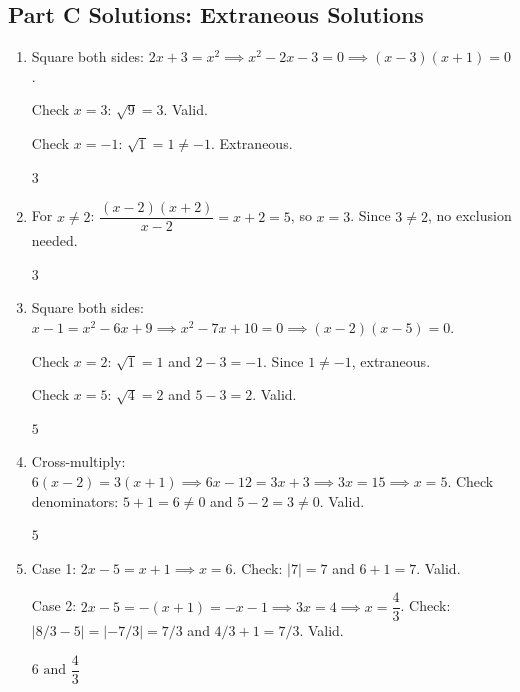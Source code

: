\documentclass[14pt]{extarticle}
\begin{document}
\subsection*{Part C Solutions: Extraneous Solutions}
\begin{enumerate}
  \item Square both sides: \(2x + 3 = x^2 \implies x^2 - 2x - 3 = 0 \implies (x-3)(x+1) = 0\).

  Check \(x = 3\): \(\sqrt{9} = 3\). Valid.

  Check \(x = -1\): \(\sqrt{1} = 1 \neq -1\). Extraneous.

  \(\boxed{3}\)

  \item For \(x \neq 2\): \(\dfrac{(x-2)(x+2)}{x-2} = x + 2 = 5\), so \(x = 3\). Since \(3 \neq 2\), no exclusion needed.

  \(\boxed{3}\)

  \item Square both sides: \(x - 1 = x^2 - 6x + 9 \implies x^2 - 7x + 10 = 0 \implies (x-2)(x-5) = 0\).

  Check \(x = 2\): \(\sqrt{1} = 1\) and \(2 - 3 = -1\). Since \(1 \neq -1\), extraneous.

  Check \(x = 5\): \(\sqrt{4} = 2\) and \(5 - 3 = 2\). Valid.

  \(\boxed{5}\)

  \item Cross-multiply: \(6(x - 2) = 3(x + 1) \implies 6x - 12 = 3x + 3 \implies 3x = 15 \implies x = 5\). Check denominators: \(5 + 1 = 6 \neq 0\) and \(5 - 2 = 3 \neq 0\). Valid.

  \(\boxed{5}\)

  \item Case 1: \(2x - 5 = x + 1 \implies x = 6\). Check: \(|7| = 7\) and \(6 + 1 = 7\). Valid.

  Case 2: \(2x - 5 = -(x + 1) = -x - 1 \implies 3x = 4 \implies x = \dfrac{4}{3}\). Check: \(|8/3 - 5| = |-7/3| = 7/3\) and \(4/3 + 1 = 7/3\). Valid.

  \(\boxed{6 \text{ and } \dfrac{4}{3}}\)
\end{enumerate}
\end{document}
